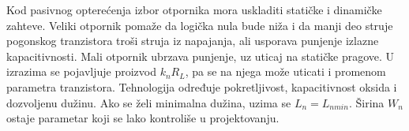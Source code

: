 Kod pasivnog opterećenja izbor otpornika mora uskladiti statičke i dinamičke zahteve. Veliki otpornik pomaže da logička nula bude niža i da manji deo struje pogonskog tranzistora troši struja iz napajanja, ali usporava punjenje izlazne kapacitivnosti. Mali otpornik ubrzava punjenje, uz uticaj na statičke pragove. U izrazima se pojavljuje proizvod $k_nR_L$, pa se na njega može uticati i promenom parametra tranzistora. Tehnologija određuje pokretljivost, kapacitivnost oksida i dozvoljenu dužinu. Ako se želi minimalna dužina, uzima se $L_n=L_{nmin}$. Širina $W_n$ ostaje parametar koji se lako kontroliše u projektovanju.
